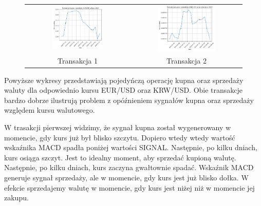 \documentclass[12pt, a4paper]{article}
\begin{document}
\begin{figure}[ht]
    \hspace{-1cm}
    \begin{tabular}{cc}
        \includegraphics[width=0.5\textwidth]{eurusd_transaction.png} &
        \includegraphics[width=0.54\textwidth]{krwusd_transaction.png}               \\
        Transakcja 1                                                  & Transakcja 2 \\
    \end{tabular}
    \label{fig:transactions}
\end{figure}

Powyższe wykresy przedstawiają pojedyńczą operację kupna oraz sprzedaży waluty
dla odpowiednio kursu EUR/USD oraz KRW/USD. Obie transakcje bardzo dobrze
ilustrują problem z opóźnieniem sygnałów kupna oraz sprzedaży względem kursu walutowego.

W trasakcji pierwszej widzimy, że sygnał kupna został wygenerowany w momencie, gdy kurs
już był blisko szczytu. Dopiero wtedy wtedy wartość wskaźnika MACD spadła poniżej wartości
SIGNAL. Następnie, po kilku dniach, kurs osiąga szczyt. Jest to idealny moment, aby 
sprzedać kupioną walutę. Następnie, po kilku dniach, kurs zaczyna gwałtownie spadać.
Wskaźnik MACD generuje sygnał sprzedaży, ale w momencie, gdy kurs jest już blisko dołka.
W efekcie sprzedajemy walutę w momencie, gdy kurs jest niżej niż w momencie jej zakupu.
\end{document}
